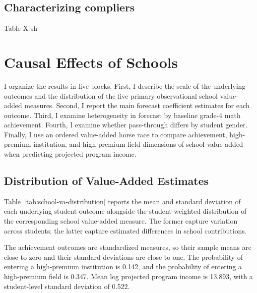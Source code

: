 \documentclass[a4paper, article, english, oneside, unknownkeysallowed, 12pt]{memoir}
\begin{document}
\subsection{Characterizing compliers}








Table X sh




\clearpage 
\section{Causal Effects of Schools}

I organize the results in five blocks.
First, I describe the scale of the underlying outcomes and the distribution of the five primary observational school value-added measures.
Second, I report the main forecast coefficient estimates for each outcome.
Third, I examine heterogeneity in forecast by baseline grade-4 math achievement.
Fourth, I examine whether pass-through differs by student gender.
Finally, I use an ordered value-added horse race to compare achievement, high-premium-institution, and high-premium-field dimensions of school value added when predicting projected program income.

\subsection{Distribution of Value-Added Estimates}

Table~\ref{tab:school-va-distribution} reports the mean and standard deviation of each underlying student outcome alongside the student-weighted distribution of the corresponding school value-added measure.
The former capture variation across students; the latter capture estimated differences in school contributions.



The achievement outcomes are standardized measures, so their sample means are close to zero and their standard deviations are close to one.
The probability of entering a high-premium institution is 0.142, and the probability of entering a high-premium field is 0.347.
Mean log projected program income is 13.893, with a student-level standard deviation of 0.522.
\end{document}
